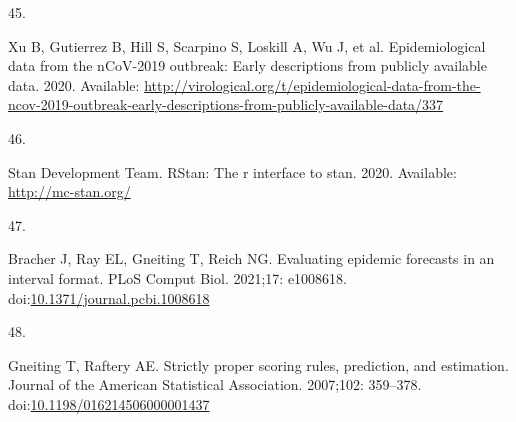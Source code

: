 \documentclass[10pt,letterpaper]{article} %
\newlength{\cslhangindent}
\newlength{\csllabelwidth}
\newlength{\cslentryspacingunit} %
\newenvironment{CSLReferences}[2] %
 {%
  \setlength{\parindent}{0pt}
  \ifodd #1
  \let\oldpar\par
  \def\par{\hangindent=\cslhangindent\oldpar}
  \fi
  \setlength{\parskip}{#2\cslentryspacingunit}
 }%
 {}
\newcommand{\CSLLeftMargin}[1]{\parbox[t]{\csllabelwidth}{#1}}
\newcommand{\CSLRightInline}[1]{\parbox[t]{\linewidth - \csllabelwidth}{#1}\break}
\providecommand{\DIFaddbegin}{} %
\providecommand{\DIFaddend}{} %
\providecommand{\DIFdelbegin}{} %
\providecommand{\DIFdelend}{} %
\newcommand{\DIFscaledelfig}{0.5}
\newlength{\DIFdelgraphicswidth} %
\newlength{\DIFdelgraphicsheight} %
\newcommand{\DIFaddincludegraphics}[2][]{{\color{blue}\fbox{\DIFOincludegraphics[#1]{#2}}}} %
\newcommand{\DIFdelincludegraphics}[2][]{%
\sbox{\DIFdelgraphicsbox}{\DIFOincludegraphics[#1]{#2}}%
\settoboxwidth{\DIFdelgraphicswidth}{\DIFdelgraphicsbox} %
\settoboxtotalheight{\DIFdelgraphicsheight}{\DIFdelgraphicsbox} %
\scalebox{\DIFscaledelfig}{%
\parbox[b]{\DIFdelgraphicswidth}{\usebox{\DIFdelgraphicsbox}\\[-\baselineskip] \rule{\DIFdelgraphicswidth}{0em}}\llap{\resizebox{\DIFdelgraphicswidth}{\DIFdelgraphicsheight}{%
\setlength{\unitlength}{\DIFdelgraphicswidth}%
\begin{picture}(1,1)%
\thicklines\linethickness{2pt} %
{\color[rgb]{1,0,0}\put(0,0){\framebox(1,1){}}}%
{\color[rgb]{1,0,0}\put(0,0){\line( 1,1){1}}}%
{\color[rgb]{1,0,0}\put(0,1){\line(1,-1){1}}}%
\end{picture}%
}\hspace*{3pt}}} %
} %
\DeclareRobustCommand{\DIFaddbegin}{\DIFOaddbegin \let\includegraphics\DIFaddincludegraphics} %
\DeclareRobustCommand{\DIFaddend}{\DIFOaddend \let\includegraphics\DIFOincludegraphics} %
\DeclareRobustCommand{\DIFdelbegin}{\DIFOdelbegin \let\includegraphics\DIFdelincludegraphics} %
\DeclareRobustCommand{\DIFdelend}{\DIFOaddend \let\includegraphics\DIFOincludegraphics} %
\begin{document}
\begin{CSLReferences}{0}{0}
\leavevmode{}%
\CSLLeftMargin{45. }
\DIFdelbegin %
\DIFdelend \DIFaddbegin \CSLRightInline{Xu B, Gutierrez B, Hill S, Scarpino S, Loskill A, Wu J,
et al. Epidemiological data from the nCoV-2019 outbreak: Early
descriptions from publicly available data. 2020. Available:
\url{http://virological.org/t/epidemiological-data-from-the-ncov-2019-outbreak-early-descriptions-from-publicly-available-data/337}}
\DIFaddend 

\leavevmode{}%
\CSLLeftMargin{46. }
\DIFdelbegin %
\DIFdelend \DIFaddbegin \CSLRightInline{Stan Development Team. RStan: The r interface to stan.
2020. Available: \url{http://mc-stan.org/}}
\DIFaddend 

\leavevmode{}%
\CSLLeftMargin{47. }
\DIFdelbegin %
\DIFdelend \DIFaddbegin \CSLRightInline{Bracher J, Ray EL, Gneiting T, Reich NG. Evaluating
epidemic forecasts in an interval format. PLoS Comput Biol. 2021;17:
e1008618.
doi:\href{https://doi.org/10.1371/journal.pcbi.1008618}{10.1371/journal.pcbi.1008618}}
\DIFaddend 

\leavevmode{}%
\CSLLeftMargin{48. }
\DIFdelbegin %
\DIFdelend \DIFaddbegin \CSLRightInline{Gneiting T, Raftery AE. Strictly proper scoring rules,
prediction, and estimation. Journal of the American Statistical
Association. 2007;102: 359--378.
doi:\href{https://doi.org/10.1198/016214506000001437}{10.1198/016214506000001437}}
\DIFaddend 


\end{CSLReferences}
\end{document}
